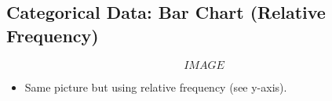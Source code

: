 \documentclass[]{report}
\begin{document}
\subsection{Categorical Data: Bar Chart (Relative Frequency)}
\[IMAGE\]
\begin{itemize}\itemsep0.2cm
\item Same picture but using relative frequency (see y-axis).
\end{itemize}


\end{document}
